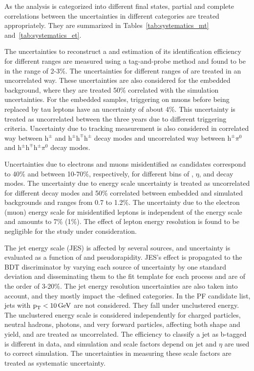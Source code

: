 As the analysis is categorized into different final states, partial and complete correlations between the uncertainties in different categories are treated appropriately. They are summarized in Tables~\ref{tab:systematics_mt} and~\ref{tab:systematics_et}.




The uncertainties to reconstruct a \tauh and estimation of its identification efficiency for different \pt ranges are measured using a tag-and-probe method and found to be in the range of 2-3\%. The uncertainties for different ranges of \pt are treated in an uncorrelated way. These uncertainties are also considered for the embedded \Pgt{}\Pgt background, where they are treated 50\% correlated with the simulation uncertainties. For the embedded samples, triggering on muons before being replaced by tau leptons have an uncertainty of about 4\%. This uncertainty is treated as uncorrelated between the three years due to different triggering criteria. Uncertainty due to tracking measurement is also considered in correlated way between $\text{h}^{\pm}$ and $\text{h}^{\pm}\text{h}^{\mp}\text{h}^{\pm}$ decay modes and uncorrelated way between $\text{h}^{\pm}\pi^{0}$ and $\text{h}^{\pm}\text{h}^{\mp}\text{h}^{\pm}\pi^{0}$ decay modes.

Uncertainties due to electrons and muons misidentified as \tauh candidates correspond to 40\% and between 10-70\%, respectively, for different bins of \pt, $\eta$, and \tauh decay modes. The uncertainty due to \tauh energy scale uncertainty is treated as uncorrelated for different decay modes and 50\% correlated between embedded and simulated backgrounds and ranges from 0.7 to 1.2\%. The uncertainty due to the electron (muon) energy scale for misidentified leptons is independent of the \tauh energy scale and amounts to 7\% (1\%). The effect of lepton energy resolution is found to be negligible for the study under consideration.

The jet energy scale (JES) is affected by several sources, and uncertainty is evaluated as a function of \pt and pseudorapidity. JES's effect is propagated to the BDT discriminator by varying each source of uncertainty by one standard deviation and disseminating them to the fit template for each process and are of the order of 3-20\%. The jet energy resolution uncertainties are also taken into account, and they mostly impact the \mjj-defined categories. In the PF candidate list, jets with $\text{p}_\text{T} < 10 \,\text{Ge\hspace{-.08em}V}$ are not considered. They fall under unclustered energy. The unclustered energy scale is considered independently for charged particles, neutral hadrons, photons, and very forward particles, affecting both shape and yield, and are treated as uncorrelated. The efficiency to classify a jet as b-tagged is different in data, and simulation and scale factors depend on jet \pt and $\eta$ are used to correct simulation. The uncertainties in measuring these scale factors are treated as systematic uncertainty.

